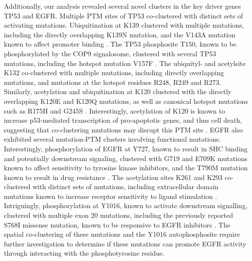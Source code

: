 Additionally, our analysis revealed several novel clusters in the key driver genes TP53 and EGFR. Multiple PTM sites of TP53 co-clustered with distinct sets of activating mutations. Ubiquitination at K139 clustered with multiple mutations, including the directly overlapping K139N mutation, and the V143A mutation known to affect promoter binding \cite{friedlanderp_orenm:MutantP531996}. The TP53 phosphosite T150, known to be phosphorylated by the COP9 signalosome, clustered with several TP53 mutations, including the hotspot mutation V157F \cite{bech-otschird_dubielw:COP9Signalosomespecific2001,woohg_thorgeirssonss:AssociationTP532011}. The ubiquityl- and acetylsite K132 co-clustered with multiple mutations, including directly overlapping mutations, and mutations at the hotspot residues R248, R249 and R273.  Similarly, acetylation and ubiquitination at K120 clustered with the directly overlapping K120E and K120Q mutations, as well as canonical hotspot mutations such as R175H and G245S \cite{melloss_attardild:NotAll2013}. Interestingly, acetylation of K120 is known to increase p53-mediated transcription of pro-apoptotic genes, and thus cell death, suggesting that co-clustering mutations may disrupt this PTM site \cite{reedsm_quellede:P53Acetylation2014}. EGFR also exhibited several mutation-PTM clusters involving functional mutations. Interestingly, phosphorylation of EGFR at Y727, known to result in SHC binding and potentially downstream signaling, clustered with G719 and E709K mutations known to affect sensitivity to tyrosine kinase inhibitors, and the T790M mutation known to result in drug resistance \cite{zhangt_songy:TreatmentUncommon2019,yunch_eckmj:T790MMutation2008,harrisonpt_huangph:RareEpidermal2020}. The acetylation sites K261 and K293 co-clustered with distinct sets of mutations, including extracellular domain mutations known to increase receptor sensitivity to ligand stimulation \cite{hoogstratey_frenchpj:EGFRMutations2020}. Intriguingly, phosphorylation at Y1016, known to activate downstream signalling, clustered with multiple exon 20 mutations, including the previously reported S768I missense mutation, known to be responsive to EGFR inhibitors \cite{kanchark_duysterj:FunctionalAnalysis2009,lundbya_olsenjv:OncogenicMutations2019}. The spatial co-clustering of these mutations and the Y1016 autophosphosite require further investigation to determine if these mutations can promote EGFR activity through interacting with the phosphotyrosine residue.

